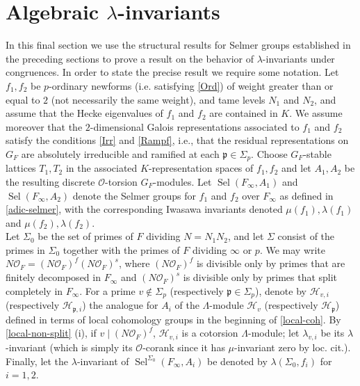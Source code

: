 \documentclass[12 pt]{amsart}
\theoremstyle{plain}
\theoremstyle{definition}
\numberwithin{equation}{section}
\numberwithin{table}{section}
\begin{document}
\section{Algebraic $\lambda$-invariants}
\label{alg-inv}
\indent In this final section we use the structural results for Selmer groups established in the preceding sections to prove a result on the behavior of $\lambda$-invariants under congruences. In order to state the precise result we require some notation. Let $f_1,f_2$ be $p$-ordinary newforms (i.e. satisfying \cref{Ord}) of weight greater than or equal to $2$ (not necessarily the same weight), and tame levels $N_1$ and $N_2$, and assume that the Hecke eigenvalues of $f_1$ and $f_2$ are contained in $K$. We assume moreover that the $2$-dimensional Galois representations associated to $f_1$ and $f_2$ satisfy the conditions \cref{Irr} and \cref{Rampf}, i.e., that the residual representations on $G_F$ are absolutely irreducible and ramified at each $\mathfrak{p}\in\Sigma_p$. Choose $G_F$-stable lattices $T_1,T_2$ in the associated $K$-representation spaces of $f_1,f_2$ and let $A_1,A_2$ be the resulting discrete $\mathscr{O}$-torsion $G_F$-modules. Let $\operatorname{Sel}(F_\infty,A_1)$ and $\operatorname{Sel}(F_\infty,A_2)$ denote the Selmer groups for $f_1$ and $f_2$ over $F_\infty$ as defined in \cref{adic-selmer}, with the corresponding Iwasawa invariants denoted $\mu(f_1),\lambda(f_1)$ and $\mu(f_2),\lambda(f_2)$.\\%
\indent Let $\Sigma_0$ be the set of primes of $F$ dividing $N=N_1N_2$, and let $\Sigma$ consist of the primes in $\Sigma_0$ together with the primes of $F$ dividing $\infty$ or $p$. We may write $N\mathscr{O}_F=(N\mathscr{O}_F)^f(N\mathscr{O}_F)^s$, where $(N\mathscr{O}_F)^f$ is divisible only by primes that are finitely decomposed in $F_\infty$ and $(N\mathscr{O}_F)^s$ is divisible only by primes that split completely in $F_\infty$. For a prime $v\notin\Sigma_p$ (respectively $\mathfrak{p}\in\Sigma_p$), denote by $\mathcal{H}_{v,i}$ (respectively $\mathcal{H}_{\mathfrak{p},i}$) the analogue for $A_i$ of the $\Lambda$-module $\mathcal{H}_v$ (respectively $\mathcal{H}_\mathfrak{p}$) defined in terms of local cohomology groups in the beginning of \cref{local-coh}. By \cref{local-non-split} (i), if $v\mid (N\mathscr{O}_F)^f$, $\mathcal{H}_{v,i}$ is a cotorsion $\Lambda$-module; let $\lambda_{v,i}$ be its $\lambda$-invariant (which is simply its $\mathscr{O}$-corank since it has $\mu$-invariant zero by loc. cit.). Finally, let the $\lambda$-invariant of $\operatorname{Sel}^{\Sigma_0}(F_\infty,A_i)$ be denoted by $\lambda(\Sigma_0,f_i)$ for $i=1,2$. 
\end{document}

